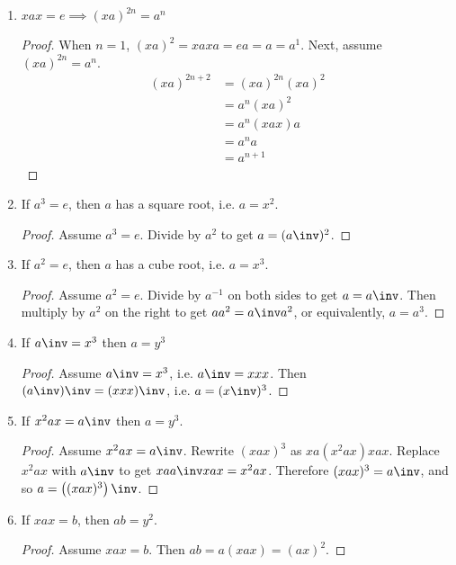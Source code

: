 \begin{enumerate}[label={\Alph*.},font={\bfseries}]
\begin{enumerate}[label={\arabic*},font={\bfseries}]
\begin{proof}
    \end{proof}
  \item $xax = e \implies (xa)^{2n} = a^n$
    \begin{proof}
      When $n=1$, $(xa)^2 = xaxa = ea = a = a^1$. Next, assume $(xa)^{2n} = a^n$.
      \begin{align*}
        (xa)^{2n+2} &= (xa)^{2n}(xa)^2 \\
        &= a^n(xa)^2 \\
        &= a^n(xax)a \\
        &= a^na \\
        &= a^{n+1}
      \end{align*}
    \end{proof}
  \item If $a^3 = e$, then $a$ has a square root, i.e. $a = x^2$.
    \begin{proof}
      Assume $a^3 = e$. Divide by $a^2$ to get $a = (a\inv)^2$.
    \end{proof}
  \item If $a^2 = e$, then $a$ has a cube root, i.e. $a = x^3$.
    \begin{proof}
      Assume $a^2 = e$. Divide by $a^{-1}$ on both sides to get $a = a\inv$.
      Then multiply by $a^2$ on the right to get $aa^2 = {a\inv}a^2$,  or equivalently, $a = a^3$.
    \end{proof}
  \item If $a\inv = x^3$ then $a = y^3$
    \begin{proof}
      Assume $a\inv = x^3$, i.e. $a\inv = xxx$. Then $(a\inv)\inv = (xxx)\inv$, i.e. $a = ({x\inv})^3$.
    \end{proof}
  \item If $x^2ax = a\inv$ then $a = y^3$.
    \begin{proof}
      Assume $x^2ax = a\inv$. Rewrite $(xax)^3$ as $xa(x^2ax)xax$.
      Replace $x^2ax$ with $a\inv$ to get $xa{a\inv}xax = x^2ax$.
      Therefore $(xax)^3 = a\inv$, and so $a = \left((xax)^3\right)\inv$.
    \end{proof}
  \item If $xax = b$, then $ab = y^2$.
    \begin{proof}
      Assume $xax = b$. Then $ab = a(xax) = (ax)^2$.
    \end{proof}
  \end{enumerate}
\end{enumerate}
